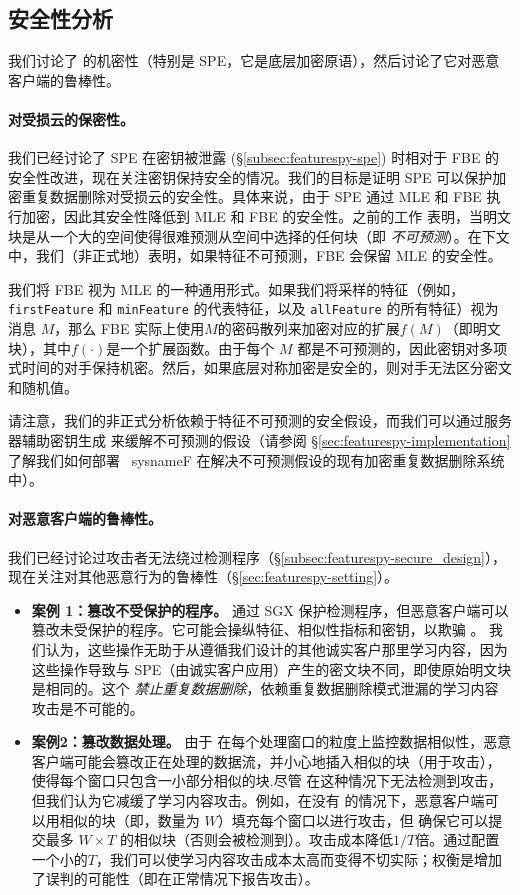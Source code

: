 \subsection{安全性分析}
\label{subsec:featurespy-security}
我们讨论了 \sysnameF 的机密性（特别是 SPE，它是底层加密原语），然后讨论了它对恶意客户端的鲁棒性。

\paragraph*{对受损云的保密性。}
我们已经讨论了 SPE 在密钥被泄露 (\S\ref{subsec:featurespy-spe}) 时相对于 FBE 的安全性改进，现在关注密钥保持安全的情况。我们的目标是证明 SPE 可以保护加密重复数据删除对受损云的安全性。具体来说，由于 SPE 通过 MLE 和 FBE 执行加密，因此其安全性降低到 MLE 和 FBE 的安全性。之前的工作 \cite{bellare13a} 表明，当明文块是从一个大的空间使得很难预测从空间中选择的任何块（即 {\em 不可预测}）。在下文中，我们（非正式地）表明，如果特征不可预测，FBE 会保留 MLE 的安全性。


我们将 FBE 视为 MLE 的一种通用形式。如果我们将采样的特征（例如，{\tt firstFeature} 和 {\tt minFeature} 的代表特征，以及 {\tt allFeature} 的所有特征）视为消息 $M$，那么 FBE 实际上使用$M$的密码散列来加密对应的扩展$f(M)$（即明文块），其中$f(\cdot)$是一个扩展函数。由于每个 $M$ 都是不可预测的，因此密钥对多项式时间的对手保持机密。然后，如果底层对称加密是安全的，则对手无法区分密文和随机值。

请注意，我们的非正式分析依赖于特征不可预测的安全假设，而我们可以通过服务器辅助密钥生成 \cite{bellare13b} 来缓解不可预测的假设（请参阅 \S\ref{sec:featurespy-implementation} 了解我们如何部署 \ sysnameF 在解决不可预测假设的现有加密重复数据删除系统中）。


\paragraph*{对恶意客户端的鲁棒性。}
我们已经讨论过攻击者无法绕过检测程序（\S\ref{subsec:featurespy-secure_design}），现在关注对其他恶意行为的鲁棒性（\S\ref{sec:featurespy-setting}）。


\begin{itemize}[leftmargin=*]
  \item {\bf 案例 1：篡改不受保护的程序。}
    \sysnameF 通过 SGX 保护检测程序，但恶意客户端可以篡改未受保护的程序。它可能会操纵特征、相似性指标和密钥，以欺骗 \sysnameF。
    我们认为，这些操作无助于从遵循我们设计的其他诚实客户那里学习内容，因为这些操作导致与 SPE（由诚实客户应用）产生的密文块不同，即使原始明文块是相同的。这个 {\em 禁止重复数据删除}，依赖重复数据删除模式泄漏的学习内容攻击是不可能的。
  \item {\bf 案例2：篡改数据处理。}
    由于 \sysnameF 在每个处理窗口的粒度上监控数据相似性，恶意客户端可能会篡改正在处理的数据流，并小心地插入相似的块（用于攻击），使得每个窗口只包含一小部分相似的块.尽管 \sysnameF 在这种情况下无法检测到攻击，但我们认为它减缓了学习内容攻击。例如，在没有 \sysnameF 的情况下，恶意客户端可以用相似的块（即，数量为 $W$）填充每个窗口以进行攻击，但 \sysnameF 确保它可以提交最多 $W\times T$ 的相似块（否则会被检测到）。攻击成本降低$1/T$倍。通过配置一个小的$T$，我们可以使学习内容攻击成本太高而变得不切实际；权衡是增加了误判的可能性（即在正常情况下报告攻击）。
\end{itemize}
  
